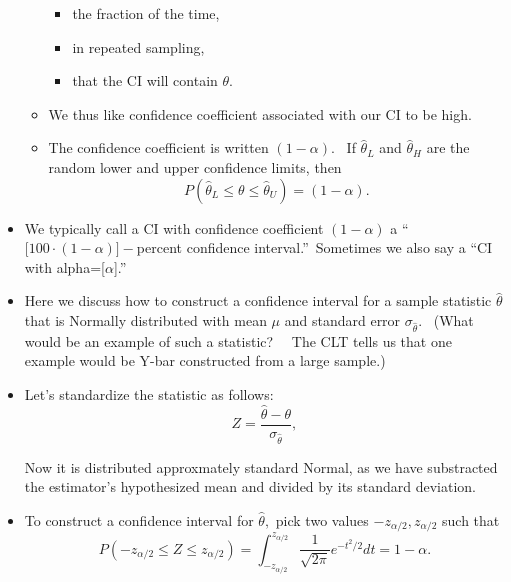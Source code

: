 \documentclass[11pt]{article}
\begin{document}
\begin{itemize}
\begin{itemize}
\begin{itemize}
\item the fraction of the time,

\item in repeated sampling,

\item that the CI will contain $\theta .$ \ 
\end{itemize}

\item We thus like confidence coefficient associated with our CI to be high.

\item The confidence coefficient is written $\left( 1-\alpha \right) .$ \ If 
$\widehat{\theta }_{L}$ and $\widehat{\theta }_{H}$ are the random lower and
upper confidence limits, then 
\begin{equation*}
P(\widehat{\theta }_{L}\leq \theta \leq \widehat{\theta }_{U})=(1-\alpha ).
\end{equation*}
\end{itemize}

\item We typically call a CI with confidence coefficient $(1-\alpha )$ a
\textquotedblleft $\lbrack 100\cdot (1-\alpha )]-$percent confidence
interval.\textquotedblright\ Sometimes we also say a \textquotedblleft CI
with alpha=[$\alpha $].\textquotedblright\ \ 

\item Here we discuss how to construct a confidence interval for a sample
statistic $\widehat{\theta }$ that is Normally distributed with mean $\mu $
and standard error $\sigma _{\widehat{\theta }}.$ \ (What would be an
example of such a statistic? \ \ The CLT tells us that one example would be
Y-bar constructed from a large sample.)

\item Let's standardize the statistic as follows:%
\begin{equation*}
Z=\frac{\widehat{\theta }-\theta }{\sigma _{\widehat{\theta }}},
\end{equation*}

Now it is distributed approxmately standard Normal, as we have substracted
the estimator's hypothesized mean and divided by its standard deviation.

\item To construct a confidence interval for $\widehat{\theta },$ pick two
values $-z_{\alpha /2},z_{\alpha /2}$ such that 
\begin{equation*}
P(-z_{\alpha /2}\leq Z\leq z_{\alpha /2})=\int_{-z_{\alpha /2}}^{z_{\alpha
/2}}\frac{1}{\sqrt{2\pi }}e^{-t^{2}/2}dt=1-\alpha .
\end{equation*}


\end{itemize}
\end{document}
